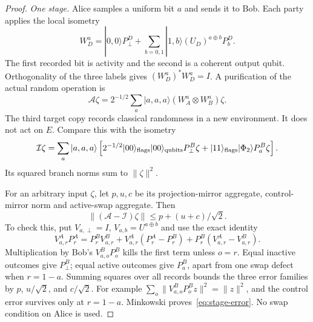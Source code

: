 \begin{proof}
\emph{One stage.} Alice samples a uniform bit $a$ and sends it to Bob. Each party applies the local isometry
\begin{equation}\label{eq:stage-isometry}
 W_D^a=|0,0\rangle P_\perp^D
 +\sum_{b=0,1}|1,b\rangle(U_D)^{a\oplus b}P_b^D.
\end{equation}
The first recorded bit is activity and the second is a coherent output qubit. Orthogonality of the three labels gives $(W_D^a)^*W_D^a=I$. A purification of the actual random operation is
\[
 \mathcal A\zeta=2^{-1/2}\sum_a|a,a,a\rangle
 (W_A^a\otimes W_B^a)\zeta.
\]
The third target copy records classical randomness in a new environment. It does not act on $E$. Compare this with the isometry
\begin{equation}\label{eq:ideal-stage}
 \mathcal I\zeta=\sum_a|a,a,a\rangle
 \left[2^{-1/2}|00\rangle_{\rm flags}|00\rangle_{\rm qubits}P_\perp^B\zeta
 +|11\rangle_{\rm flags}|\Phi_2\rangle P_a^B\zeta\right].
\end{equation}
Its squared branch norms sum to $\|\zeta\|^2$.

For an arbitrary input $\zeta$, let $p,u,c$ be its projection-mirror aggregate, control-mirror norm and active-swap aggregate. Then
\begin{equation}\label{eq:stage-error}
 \|(\mathcal A-\mathcal I)\zeta\|\le p+(u+c)/\sqrt2.
\end{equation}
To check this, put $V_{a,\perp}=I$, $V_{a,b}=U^{a\oplus b}$ and use the exact identity
\[
 V^A_{a,r}P_r^A
 =P_r^BV^B_{a,r}+V^A_{a,r}(P_r^A-P_r^B)
 +P_r^B(V^A_{a,r}-V^B_{a,r}).
\]
Multiplication by Bob's $V^B_{a,o}P_o^B$ kills the first term unless $o=r$. Equal inactive outcomes give $P_\perp^B$; equal active outcomes give $P_a^B$, apart from one swap defect when $r=1-a$. Summing squares over all records bounds the three error families by $p$, $u/\sqrt2$, and $c/\sqrt2$. For example $\sum_o\|V^B_{a,o}P_o^Bz\|^2=\|z\|^2$, and the control error survives only at $r=1-a$. Minkowski proves~\eqref{eq:stage-error}. No swap condition on Alice is used.


\end{proof}
